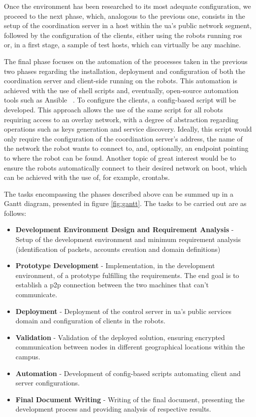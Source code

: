 \documentclass[11pt,twoside,a4paper]{report}
\begin{document}
Once the environment has been researched to its most adequate configuration, we proceed to the next phase, which, analogous to the previous one, consists in the setup of the coordination server in a host within the \ac{ua}'s public network segment, followed by the configuration of the clients, either using the robots running \ac{ros} or, in a first stage, a sample of test hosts, which can virtually be any machine.

The final phase focuses on the automation of the processes taken in the previous two phases regarding the installation, deployment and configuration of both the coordination server and client-side running on the robots. This automation is achieved with the use of shell scripts and, eventually, open-source automation tools such as Ansible ~\cite{ansiblews}. To configure the clients, a config-based script will be developed. This approach allows the use of the same script for all robots requiring access to an overlay network, with a degree of abstraction regarding operations such as keys generation and service discovery. Ideally, this script would only require the configuration of the coordination server's address, the name of the network the robot wants to connect to, and, optionally, an endpoint pointing to where the robot can be found. Another topic of great interest would be to ensure the robots automatically connect to their desired network on boot, which can be achieved with the use of, for example, crontabs.

The tasks encompassing the phases described above can be summed up in a Gantt diagram, presented in figure \ref{fig:gantt}. The tasks to be carried out are as follows:

\begin{itemize}
  \item \textbf{Development Environment Design and Requirement Analysis} - Setup of the development environment and minimum requirement analysis (identification of packets, accounts creation and domain definitions)
  \item \textbf{Prototype Development} - Implementation, in the development environment, of a prototype fulfilling the requirements. The end goal is to establish a \ac{p2p} connection between the two machines that can't communicate.
  \item \textbf{Deployment} - Deployment of the control server in \ac{ua}'s public services domain and configuration of clients in the robots.
  \item \textbf{Validation} - Validation of the deployed solution, ensuring encrypted communication between nodes in different geographical locations within the campus.
  \item \textbf{Automation} - Development of config-based scripts automating client and server configurations.
  \item \textbf{Final Document Writing} - Writing of the final document, presenting the development process and providing analysis of respective results.
\end{itemize}
\end{document}
